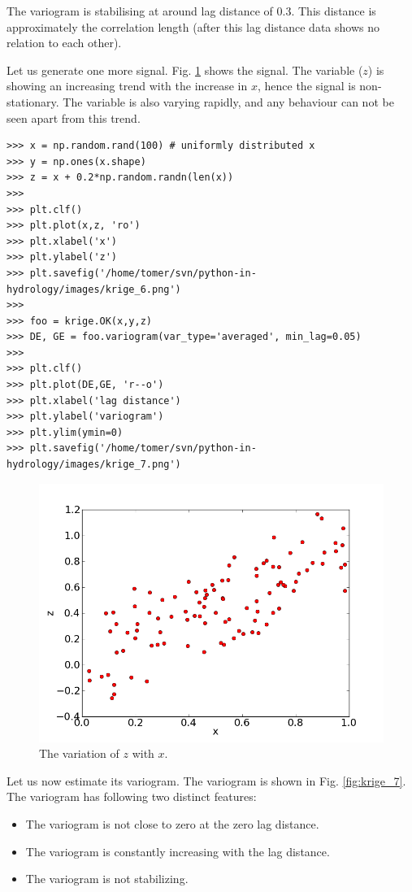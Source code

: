 \documentclass[10pt]{book}
\begin{document}
The variogram is stabilising at around lag distance of 0.3. This distance is approximately the correlation length (after this lag distance data shows no relation to each other). 

Let us generate one more signal. Fig. \ref{fig:krige_6} shows the signal. The variable ($z$) is showing an increasing trend with the increase in $x$, hence the signal is non-stationary. The variable is also varying rapidly, and any behaviour can not be seen apart from this trend. 
\beforeverb \begin{verbatim}
>>> x = np.random.rand(100) # uniformly distributed x
>>> y = np.ones(x.shape) 
>>> z = x + 0.2*np.random.randn(len(x))
>>> 
>>> plt.clf()
>>> plt.plot(x,z, 'ro')
>>> plt.xlabel('x')
>>> plt.ylabel('z')
>>> plt.savefig('/home/tomer/svn/python-in-hydrology/images/krige_6.png')
>>> 
>>> foo = krige.OK(x,y,z)
>>> DE, GE = foo.variogram(var_type='averaged', min_lag=0.05)
>>> 
>>> plt.clf()
>>> plt.plot(DE,GE, 'r--o')
>>> plt.xlabel('lag distance')
>>> plt.ylabel('variogram')
>>> plt.ylim(ymin=0)
>>> plt.savefig('/home/tomer/svn/python-in-hydrology/images/krige_7.png')
\end{verbatim} \afterverb


\beforefig
\begin{figure}[h!]
  \centering
    \includegraphics[scale=0.5]{images/krige_6.png}
  \caption{The variation of $z$ with $x$.}
   \label{fig:krige_6}
\end{figure}
\afterfig

Let us now estimate its variogram. The variogram is shown in Fig. \ref{fig:krige_7}. The variogram has following two distinct features:
\begin{itemize}
\item The variogram is not close to zero at the zero lag distance. \\
\item The variogram is constantly increasing with the lag distance. \\
\item The variogram is not stabilizing. \\
\end{itemize}
\end{document}

